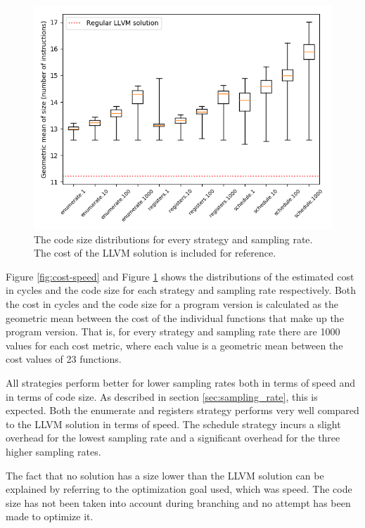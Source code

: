 \begin{figure}[h]
	\centering
	\includegraphics[width=\textwidth,height=0.5\textheight]{results/figures/cost_size}
	\caption{The code size distributions for every strategy and sampling rate. The cost of the LLVM solution is included for reference.}
	\label{fig:cost-size}
\end{figure}

Figure \ref{fig:cost-speed} and Figure \ref{fig:cost-size} shows the distributions of the
estimated cost in cycles and the code size for each strategy and sampling rate
respectively. Both the cost in cycles and the code size for a program version is
calculated as the geometric mean between the cost of the individual functions that make
up the program version. That is, for every strategy and sampling rate there are 1000
values for each cost metric, where each value is a geometric mean between the cost values
of 23 functions.

All strategies perform better for lower sampling rates both in terms of speed and in terms
of code size. As described in section \ref{sec:sampling_rate}, this is expected. Both the
enumerate and registers strategy performs very well compared to the LLVM solution
in terms of speed. The schedule strategy incurs a slight overhead for the lowest sampling
rate and a significant overhead for the three higher sampling rates.

The fact that no solution has a size lower than the LLVM solution can be explained by
referring to the optimization goal used, which was speed. The code size has not been taken
into account during branching and no attempt has been made to optimize it.

